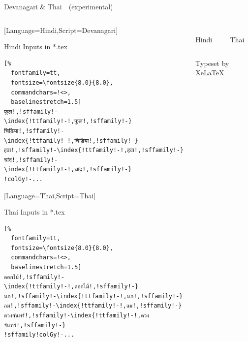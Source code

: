 \documentclass[aspectratio=169,10pt]{beamer}
\begin{document}

\setmonofont{Noto Sans Mono}
\begin{frame}[fragile]{Devanagari \& Thai~~{\scriptsize (experimental)}}

\begin{columns}
\begin{column}{50mm}

\setmonofont{Noto Serif Devanagari}[Language=Hindi,Script=Devanagari]
\setmainfont{Noto Sans Mono}
\setsansfont{Noto Sans}
\begin{exampleblock}{Hindi Inputs in *.tex}
\begin{Verbatim}[%
  fontfamily=tt,
  fontsize=\fontsize{8.0}{8.0},
  commandchars=!<>,
  baselinestretch=1.5]
फूल!,!sffamily!-\index{!ttfamily!-!,फूल!,!sffamily!-}
चिड़िया!,!sffamily!-\index{!ttfamily!-!,चिड़िया!,!sffamily!-}
हवा!,!sffamily!-\index{!ttfamily!-!,हवा!,!sffamily!-}
चांद!,!sffamily!-\index{!ttfamily!-!,चांद!,!sffamily!-}
!colGy!-...
\end{Verbatim}
\end{exampleblock}
\setmonofont{Noto Serif Thai}[Language=Thai,Script=Thai]
\setmainfont{Noto Sans Mono}
\setsansfont{Noto Sans}
\begin{exampleblock}{Thai Inputs in *.tex}
\begin{Verbatim}[%
  fontfamily=tt,
  fontsize=\fontsize{8.0}{8.0},
  commandchars=!<>,
  baselinestretch=1.5]
ดอกไม้!,!sffamily!-\index{!ttfamily!-!,ดอกไม้!,!sffamily!-}
นก!,!sffamily!-\index{!ttfamily!-!,นก!,!sffamily!-}
ลม!,!sffamily!-\index{!ttfamily!-!,ลม!,!sffamily!-}
ดวงจันทร์!,!sffamily!-\index{!ttfamily!-!,ดวงจันทร์!,!sffamily!-}
!sffamily!colGy!-...
\end{Verbatim}
\end{exampleblock}
\end{column}

\begin{column}{79mm}

\begin{columns}
\begin{column}{39mm}
\begin{center}
\\[2mm]%
Hindi
\end{center}
\end{column}

\begin{column}{39mm}
\begin{center}
\\[2mm]%
Thai
\end{center}
\end{column}
\end{columns}
\vspace{2mm}
\begin{center}
{\normalsize Typeset by XeLaTeX}
\end{center}
\end{column}


\end{columns}
\end{frame}
\end{document}
